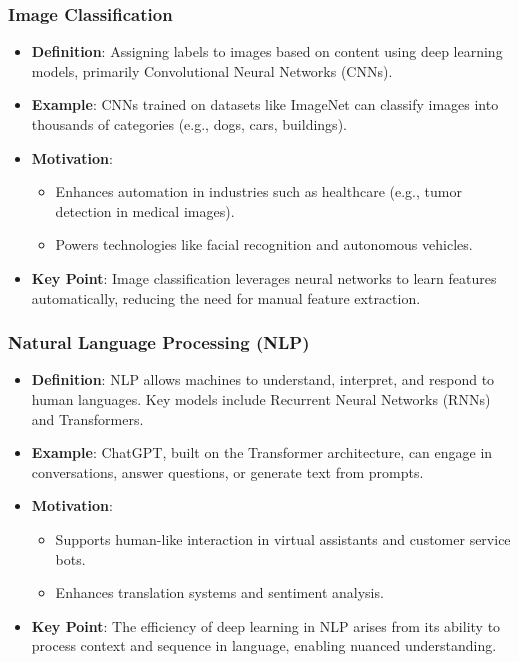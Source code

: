 \documentclass[aspectratio=169]{beamer}
\begin{document}
\begin{frame}[fragile]
    \frametitle{Image Classification}
    \begin{itemize}
        \item \textbf{Definition}: Assigning labels to images based on content using deep learning models, primarily Convolutional Neural Networks (CNNs).
        \item \textbf{Example}: CNNs trained on datasets like ImageNet can classify images into thousands of categories (e.g., dogs, cars, buildings).
        \item \textbf{Motivation}:
            \begin{itemize}
                \item Enhances automation in industries such as healthcare (e.g., tumor detection in medical images).
                \item Powers technologies like facial recognition and autonomous vehicles.
            \end{itemize}
        \item \textbf{Key Point}: Image classification leverages neural networks to learn features automatically, reducing the need for manual feature extraction.
    \end{itemize}
\end{frame}

\begin{frame}[fragile]
    \frametitle{Natural Language Processing (NLP)}
    \begin{itemize}
        \item \textbf{Definition}: NLP allows machines to understand, interpret, and respond to human languages. Key models include Recurrent Neural Networks (RNNs) and Transformers.
        \item \textbf{Example}: ChatGPT, built on the Transformer architecture, can engage in conversations, answer questions, or generate text from prompts.
        \item \textbf{Motivation}:
            \begin{itemize}
                \item Supports human-like interaction in virtual assistants and customer service bots.
                \item Enhances translation systems and sentiment analysis.
            \end{itemize}
        \item \textbf{Key Point}: The efficiency of deep learning in NLP arises from its ability to process context and sequence in language, enabling nuanced understanding.
    \end{itemize}
\end{frame}
\end{document}
